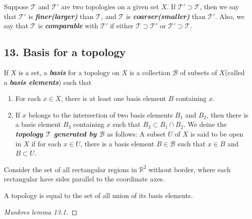 \begin{mydefinition}
Suppose $\mathcal{T}$ and $\mathcal{T}'$ are two topologies on a given set $X$. If $\mathcal{T}'\supset \mathcal{T}$, then we say that $\mathcal{T}'$ is \textbf{\emph{finer(larger)}} than $\mathcal{T}$, and $\mathcal{T}$ is \textbf{\emph{coarser(smaller)}} than $\mathcal{T}'$. Also, we say that $\mathcal{T}$ is \textbf{\emph{comparable}} with $\mathcal{T}'$ if either $\mathcal{T}\supset \mathcal{T}'$ or $\mathcal{T}'\supset \mathcal{T}$.
\end{mydefinition}

\subsection{13. Basis for a topology}
\begin{mydefinition}
If $X$ is a set, a \textbf{\emph{basis}} for a topology on $X$ is a collection $\mathcal{B}$ of subsets of $X$(called a \textbf{\emph{basis elements}}) such that
\begin{enumerate}[label={(\alph*)}]
\item For each $x\in X$, there is at least one basis element $B$ containing $x$.
\item If $x$ belongs to the intersection of two basis elements $B_1$ and $B_2$, then there is a basis element $B_3$ containing $x$ such that $B_3\subset B_1\cap B_2$. We deine the \textbf{\emph{topology $\mathcal{T}$ generated by $\mathcal{B}$}} as follows: A subset $U$ of $X$ is said to be open in $X$ if for each $x\in U$, there is a basis element $B\in \mathcal{B}$ such that $x\in B$ and $B\subset U$.
\end{enumerate}
\end{mydefinition}

\begin{example}
Consider the set of all rectangular regions in $\mathbb{R}^2$ without border, where each rectangular have sides parallel to the coordinate axes. 
\end{example}

\begin{mylemma}
A topology is equal to the set of all union of its basis elements.
\end{mylemma}
\begin{proof}
[Munkres lemma 13.1]
\end{proof}

